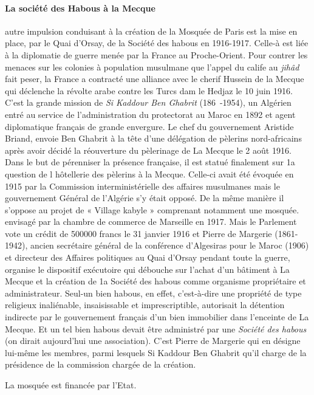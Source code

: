 \paragraph{La société des Habous à la Mecque}
autre impulsion conduisant à la création de la Mosquée de
Paris est la mise en place, par le Quai d'Orsay, de la Société des
habous en 1916-1917. Celle-à est liée à la diplomatie de guerre
menée par la France au Proche-Orient. Pour contrer les menaces
sur les colonies à population musulmane que l'appel du calife au
\emph{jihâd} fait peser, la France a contracté une alliance avec le cherif
Hussein de la Mecque qui déclenche la révolte arabe contre les
Turcs dam le Hedjaz le 10 juin 1916. C'est la grande mission de
\emph{Si Kaddour Ben Ghabrit }(186~-1954), un Algérien entré au service
de l'administration du protectorat au Maroc en 1892 et
agent diplomatique français de grande envergure.
Le chef du gouvernement Aristide Briand, envoie Ben Ghabrit à
la tête d'une délégation de pèlerins nord-africains après avoir
décidé la réouverture du pèlerinage de La Mecque le 2 août 1916.
Dans le but de pérenniser la présence française, il est statué finalement
sur 1a question de l hôtellerie des pèlerins à la Mecque.
Celle-ci avait été évoquée en 1915 par la Commission interministérielle
des affaires musulmanes mais le gouvernement Général
de l'Algérie s'y était opposé. De la même manière il s'oppose
au projet de « Village kabyle » comprenant notamment une mosquée.
envisagé par la chambre de commerce de Marseille en
1917. Mais le Parlement vote un crédit de 500000 francs le
31 janvier 1916 et Pierre de Margerie (1861-1942), ancien secrétaire
général de la conférence d'Algesiras pour le Maroc (1906)
et directeur des Affaires politiques au Quai d'Orsay pendant toute
la guerre, organise le dispositif exécutoire qui débouche sur
l'achat d'un bâtiment à La Mecque et la création de 1a Société des
habous comme organisme propriétaire et administrateur.
Seul-un bien habous, en effet, c'est-à-dire une propriété de type
religieux inaliénable, insaisissable et imprescriptible, autorisait
la détention indirecte par le gouvernement français d'un bien
immobilier dans l'enceinte de La Mecque. Et un tel bien habous
devait être administré par une \textit{Société des habous} (on dirait
aujourd'hui une association). C'est Pierre de Margerie qui en
désigne lui-même les membres, parmi lesquels Si Kaddour Ben
Ghabrit qu'il charge de la présidence de la commission chargée de la création. 

La mosquée est financée par l'Etat.

